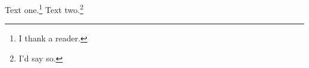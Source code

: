 \documentclass{article}
\begin{document}
Text one.\footnote{I thank a reader.}
Text two.\footnote{I'd say so.}
\end{document}
